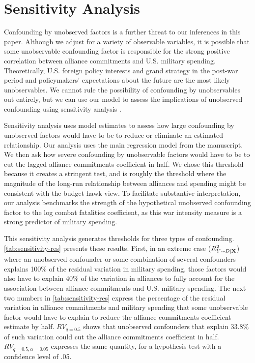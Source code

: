 \documentclass[12pt]{article}
\begin{document}
\section{Sensitivity Analysis}


Confounding by unobserved factors is a further threat to our inferences in this paper. 
Although we adjust for a variety of observable variables, it is possible that some unobservable confounding factor is responsible for the strong positive correlation between alliance commitments and U.S. military spending. 
Theoretically, U.S. foreign policy interests and grand strategy in the post-war period and policymakers' expectations about the future are the most likely unobservables. 
We cannot rule the possibility of confounding by unobservables out entirely, but we can use our model to assess the implications of unobserved confounding using sensitivity analysis \citep{CinelliHazlett2020}. 


Sensitivity analysis uses model estimates to assess how large confounding by unobserved factors would have to be to reduce or eliminate an estimated relationship. 
Our analysis uses the main regression model from the manuscript. 
We then ask how severe confounding by unobservable factors would have to be to cut the lagged alliance commitments coefficient in half.
We chose this threshold because it creates a stringent test, and is roughly the threshold where the magnitude of the long-run relationship between alliances and spending might be consistent with the budget hawk view.
To facilitate substantive interpretation, our analysis benchmarks the strength of the hypothetical unobserved confounding factor to the log combat fatalities coefficient, as this war intensity measure is a strong predictor of military spending. 


This sensitivity analysis generates thresholds for three types of confounding. 
\autoref{tab:sensitivity-res} presents these results.
First, in an extreme case ($R^2_{Y \sim D |{\bf X}}$) where an unobserved confounder or some combination of several confounders explains 100\% of the residual variation in military spending, those factors would also have to explain 40\% of the variation in alliances to fully account for the association between alliance commitments and U.S. military spending.  
The next two numbers in \autoref{tab:sensitivity-res} express the percentage of the residual variation in alliance commitments and military spending that some unobservable factor would have to explain to reduce the alliance commitments coefficient estimate by half. 
$RV_{q = 0.5}$ shows that unobserved confounders that explain 33.8\% of such variation could cut the alliance commitments coefficient in half. 
$RV_{q = 0.5, \alpha = 0.05}$ expresses the same quantity, for a hypothesis test with a confidence level of .05.
\end{document}
